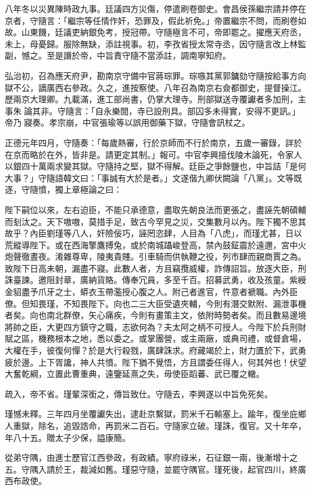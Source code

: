 \begin{pinyinscope}
八年冬以災異陳時政九事。廷議四方災傷，停遣刷卷御史。會昌侯孫繼宗請并停在京者，守隨言：「繼宗等任情作奸，恐罪及，假此祈免。」帝置繼宗不問，而刷卷如故。山東饑，廷議吏納銀免考，授冠帶。守隨極言不可，帝即罷之。擢應天府丞，未上，母憂歸。服除無缺，添註視事。初，李孜省授太常寺丞，因守隨言改上林監副，憾之。至是譖於帝，中旨責守隨不當添註，調南寧知府。

弘治初，召為應天府尹，勘南京守備中官蔣琮罪。琮嗾其黨郭鏞劾守隨按給事方向獄不公，謫廣西右參政。久之，進按察使。八年召為南京右僉都御史，提督操江。歷兩京大理卿。九載滿，進工部尚書，仍掌大理寺。刑部獄送寺覆讞者多加刑，主事朱論其非。守隨言：「自永樂間，寺已設刑具。部囚多未得實，安得不更訊。」帝乃寢奏。孝宗崩，中官張瑜等以誤用御藥下獄，守隨會訊杖之。

正德元年四月，守隨奏：「每歲熱審，行於京師而不行於南京，五歲一審錄，詳於在京而略於在外，皆非是。請更定其制。」報可。中官李興擅伐陵木論死，令家人以銀四十萬兩求變其獄。守隨持之堅，獄不得解。廷臣之爭餘鹽也，中旨詰「是何大事？」守隨語韓文曰：「事誠有大於是者。」文遂偕九卿伏闕論「八黨」。文等既逐，守隨憤，獨上章極論之曰：

陛下嗣位以來，左右迫臣，不能只承德意，盡取先朝良法而更張之，盡誣先朝碩輔而刬汰之。天下嗷嗷，莫措手足，致古今罕見之災，交集數月以內。陛下獨不思其故乎？內臣劉瑾等八人，奸險佞巧，誣罔恣肆，人目為「八虎」，而瑾尤甚，日以荒縱導陛下。或在西海擎鷹搏兔，或於南城躡峻登高，禁內鼓鉦震於遠邇，宮中火炮聲徹晝夜。淆雜尊卑，陵夷貴賤。引車騎而供執鞭之役，列市肆而親商賈之為。致陛下日高未朝，漏盡不寢。此數人者，方且竊攬威權，詐傳詔旨。放逐大臣，刑誅臺諫。邀阻封章，廣納貨賂。傳奉冗員，多至千百。招募武勇，收及孩童。紫綬金貂盡予爪牙之士，蟒衣玉帶濫授心腹之人。附己者進官，忤意者褫職。內外臣僚。但知畏瑾，不知畏陛下。向也二三大臣受遺夾輔，今則有潛交默附、漏泄事機者矣。向也南北群僚，矢心痛疾，今則有畫策主文，依附時勢者矣。而且數易邊境將帥之臣，大更四方鎮守之職，志欲何為？夫太阿之柄不可授人。今陛下於兵刑財賦之區，機務根本之地，悉以委之。或掌團營，或主兩廠，或典司禮，或督倉場，大權在手，彼復何憚？於是大行殺戮，廣肆誅求。府藏竭於上，財力匱於下，武勇疲於邊。上下胥讒，神人共憤。陛下猶不覺悟，方且謂委任得人，何其舛也！伏望大奮乾綱，立置此曹重典，遠鑒延熹之失，毋使臣蹈蕃、武已覆之轍。

疏入，帝不省。瑾輩深銜之，傳旨致仕。守隨去，李興遂以中旨免死矣。

瑾憾未釋。三年四月坐覆讞失出，逮赴京繫獄，罰米千石輸塞上。踰年，復坐庇鄉人重獄，除名，追毀誥命，再罰米二百石。守隨家立破。瑾誅，復官。又十年卒，年八十五。贈太子少保，謚康簡。

從弟守隅，由進士歷官江西參政，有政績。寧府祿米，石征銀一兩，後漸增十之五。守隅入請於王，裁減如舊。瑾惡守隨，並罷守隅官。瑾死後，起官四川，終廣西布政使。


\end{pinyinscope}
